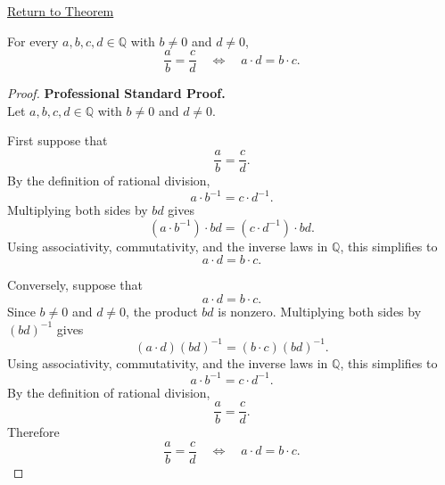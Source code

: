 \newpage
{}
\label{prf:rational-cross-multiplication}

\begin{remark*}[Return]
\hyperref[thm:rational-cross-multiplication]{Return to Theorem}
\end{remark*}

\begin{theorem*}
For every $a,b,c,d\in\mathbb{Q}$ with $b\neq 0$ and $d\neq 0$,
\[
\frac{a}{b}=\frac{c}{d}
\quad\Longleftrightarrow\quad
a\cdot d=b\cdot c.
\]
\end{theorem*}

\begin{proof}
\textbf{Professional Standard Proof.}~\\
Let $a,b,c,d\in\mathbb{Q}$ with $b\neq 0$ and $d\neq 0$.

First suppose that
\[
\frac{a}{b}=\frac{c}{d}.
\]
By the definition of rational division,
\[
a\cdot b^{-1}=c\cdot d^{-1}.
\]
Multiplying both sides by $bd$ gives
\[
(a\cdot b^{-1})\cdot bd=(c\cdot d^{-1})\cdot bd.
\]
Using associativity, commutativity, and the inverse laws in $\mathbb{Q}$,
this simplifies to
\[
a\cdot d=b\cdot c.
\]

Conversely, suppose that
\[
a\cdot d=b\cdot c.
\]
Since $b\neq 0$ and $d\neq 0$, the product $bd$ is nonzero. Multiplying
both sides by $(bd)^{-1}$ gives
\[
(a\cdot d)(bd)^{-1}=(b\cdot c)(bd)^{-1}.
\]
Using associativity, commutativity, and the inverse laws in $\mathbb{Q}$,
this simplifies to
\[
a\cdot b^{-1}=c\cdot d^{-1}.
\]
By the definition of rational division,
\[
\frac{a}{b}=\frac{c}{d}.
\]
Therefore
\[
\frac{a}{b}=\frac{c}{d}
\quad\Longleftrightarrow\quad
a\cdot d=b\cdot c.
\]
\end{proof}

